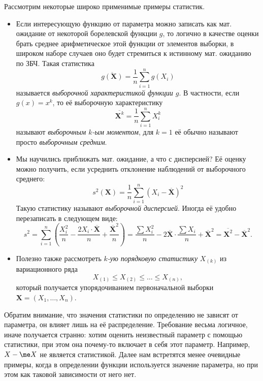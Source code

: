 \begin{example}
    Рассмотрим некоторые широко применимые примеры статистик.
    \begin{itemize}
        \item Если интересующую функцию от параметра можно записать как мат. ожидание от некоторой борелевской функции $g$, то логично в качестве оценки брать среднее арифметическое этой функции от элементов выборки, в широком наборе случаев оно будет стремиться к истинному мат. ожиданию по ЗБЧ. Такая статистика
        \[
        \overline{g(\mathbf X)} = \frac{1}{n}\sum_{i=1}^n g(X_i)
        \]
        называется \textit{выборочной характеристикой функции $g$}. В частности, если $g(x) = x^k$, то её выборочную характеристику
        \[
        \overline{\mathbf X^k} = \frac{1}{n}\sum_{i=1}^n X_i^k
        \]
        называют \textit{выборочным $k$-ым моментом}, для $k=1$ её обычно называют просто \textit{выборочным средним}.

        \item Мы научились приближать мат. ожидание, а что с дисперсией? Её оценку можно получить, если усреднить отклонение наблюдений от выборочного среднего:
        \[
        s^2(\mathbf X) = \frac{1}{n}\sum_{i=1}^n \left(X_i - \overline{\mathbf X}\right)^2
        \]
        Такую статистику называют \textit{выборочной дисперсией}. Иногда её удобно перезаписать в следующем виде:
        \[
        s^2 = \sum_{i=1}^n \left( \frac{X^2_i}{n} - \frac{2 X_i \cdot \overline{\mathbf X}}{n} + \frac{\overline{\mathbf X}^2}{n} \right) = \frac{\sum X^2_i}{n} -  2\overline{\mathbf X} \cdot \frac{\sum X_i}{n} + \overline{\mathbf X}^2 = \overline{\mathbf X^2} - \overline{\mathbf X}^2.
        \]

        \item Полезно также рассмотреть \textit{$k$-ую порядковую статистику} $X_{(k)}$ из вариационного ряда
        \[
        X_{(1)} \le X_{(2)} \le \ldots \le X_{(n)},
        \]
        который получается упорядочиванием первоначальной выборки $\mathbf X = (X_1, \ldots, X_n)$. 
    \end{itemize}
\end{example}

Обратим внимание, что значения статистики по определению не зависят от параметра, он влияет лишь на её распределение. Требование весьма логичное, иначе получается странно: хотим оценить неизвестный параметр с помощью статистики, при этом она почему-то включает в себя этот параметр. Например, $X - \me X$ не является статистикой. Далее нам встретятся менее очевидные примеры, когда в определении функции используется значение параметра, но при этом как таковой зависимости от него нет.

